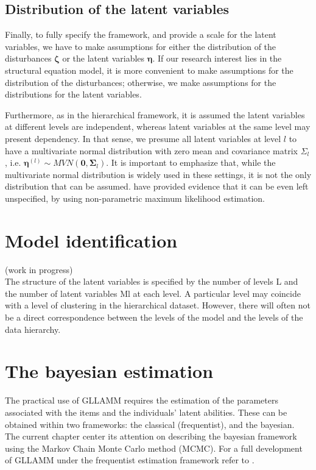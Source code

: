 \subsection{Distribution of the latent variables} \label{s_sect:dist_lv}
Finally, to fully specify the framework, and provide a scale for the latent variables, we have to make assumptions for either the distribution of the disturbances $\pmb{\zeta}$ or the latent variables $\pmb{\eta}$. If our research interest lies in the structural equation model, it is more convenient to make assumptions for the distribution of the disturbances; otherwise, we make assumptions for the distributions for the latent variables. 

Furthermore, as in the hierarchical framework, it is assumed the latent variables at different levels are independent, whereas latent variables at the same level may present dependency. In that sense, we presume all latent variables at level $l$ to have a multivariate normal distribution with zero mean and covariance matrix $\Sigma_{l}$, i.e. $\pmb{\eta}^{(l)} \sim MVN(\mathbf{0}, \pmb{\Sigma}_{l})$. It is important to emphasize that, while the multivariate normal distribution is widely used in these settings, it is not the only distribution that can be assumed. \citet{Rabe_et_al_2003a} have provided evidence that it can be even left unspecified, by using non-parametric maximum likelihood estimation.



\section{Model identification} \label{sect:identification}
{\color{red}(work in progress) \\
	
The structure of the latent variables is specified by the number of levels L and the number of latent variables Ml at each level. A particular level may coincide with a level of clustering in the hierarchical dataset. However, there will often not be a direct correspondence between the levels of the model and the levels of the data hierarchy.

}




\section{The bayesian estimation}


The practical use of GLLAMM requires the estimation of the parameters associated with the items and the individuals' latent abilities. These can be obtained within two frameworks: the classical (frequentist), and the bayesian. The current chapter center its attention on describing the bayesian framework using the Markov Chain Monte Carlo method (MCMC). For a full development of GLLAMM under the frequentist estimation framework refer to \citet{Rabe_et_al_2004a, Rabe_et_al_2004b, Skrondal_et_al_2004a, Rabe_et_al_2012}.


